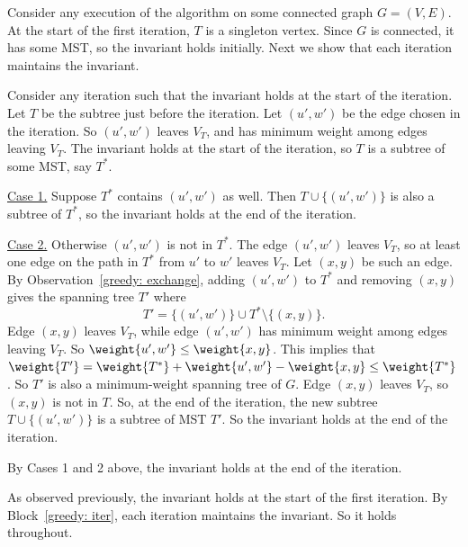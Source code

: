 \begin{longFormProof}
  \step Consider any execution of the algorithm on some connected graph $G=(V,E)$.
  \step At the start of the first iteration, $T$ is a singleton vertex.
  \step Since $G$ is connected, it has some MST, so the invariant holds initially.
  \step Next we show that each iteration maintains the invariant.
  \begin{block}
    \step Consider any iteration such that the invariant holds at the start of the iteration.
    \step Let $T$ be the subtree just before the iteration.  
    \step Let $(u',w')$ be the edge chosen in the iteration.
     So $(u', w')$ leaves $V_T$,
    and has minimum weight among edges leaving $V_T$.
    \step The invariant holds at the start of the iteration, so $T$ is a subtree of some MST, say $T^*$.
    \begin{block}[greedy: C1]
      \step \underline{Case 1.}  Suppose $T^*$ contains $(u', w')$ as well.
      \step Then $T\cup\{(u',w')\}$ is also a subtree of $T^*$, so the invariant holds at the end of the iteration.
    \end{block}
    \begin{block}[greedy: C2]
      \step \underline{Case 2.}  Otherwise $(u', w')$ is not in $T^*$.
      \step The edge $(u', w')$ leaves $V_T$,
      so at least one edge on the path in $T^*$ from $u'$ to $w'$ leaves $V_T$.
      \step Let $(x, y)$ be such an edge.
      \step By Observation~\ref{greedy: exchange}, adding $(u', w')$ to $T^*$
      and removing $(x, y)$ gives the spanning tree $T'$ where
      \[T' = \{(u', w')\} \cup T^* \setminus \{(x, y)\}.\]
      \step Edge $(x,y)$ leaves $V_T$, while edge $(u', w')$ has minimum weight among edges leaving $V_T$.
      \step So $\weight{u', w'} \le \weight {x, y}$.
      This implies that $\weight{T'} = \weight{T^*} +\weight{u', w'} - \weight {x, y} \le \weight{T^*}$.
      \step So $T'$ is also a minimum-weight spanning tree of $G$.
      \step Edge $(x, y)$ leaves $V_T$, so $(x, y)$ is not in $T$.
      \step So, at the end of the iteration,
      the new subtree $T\cup \{(u', w')\}$ is a subtree of MST $T'$.
      \step So the invariant holds at the end of the iteration.
    \end{block}
    \step By Cases 1 and 2 above, the invariant holds at the end of the iteration.
  \end{block}
  \step As observed previously, the invariant holds at the start of the first iteration.
  \step By Block~\ref{greedy: iter}, each iteration maintains the invariant.  So it holds throughout.
\end{longFormProof}


